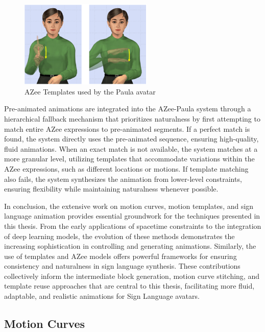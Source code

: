 \documentclass[../../main.tex]{subfiles}
\begin{document}
\begin{figure}
    \centering \includegraphics[width = 2.5in]{chapters/intermediate_blocks/images/azee_template_example.png}
    \caption{AZee Templates used by the Paula avatar}
    \label{fig:azee_template_example}
\end{figure}

Pre-animated animations are integrated into the AZee-Paula system through a hierarchical fallback mechanism that prioritizes naturalness by first attempting to match entire AZee expressions to pre-animated segments. If a perfect match is found, the system directly uses the pre-animated sequence, ensuring high-quality, fluid animations. When an exact match is not available, the system matches at a more granular level, utilizing templates that accommodate variations within the AZee expressions, such as different locations or motions. If template matching also fails, the system synthesizes the animation from lower-level constraints, ensuring flexibility while maintaining naturalness whenever possible.

In conclusion, the extensive work on motion curves, motion templates, and sign language animation provides essential groundwork for the techniques presented in this thesis. From the early applications of spacetime constraints to the integration of deep learning models, the evolution of these methods demonstrates the increasing sophistication in controlling and generating animations. Similarly, the use of templates and AZee models offers powerful frameworks for ensuring consistency and naturalness in sign language synthesis. These contributions collectively inform the intermediate block generation, motion curve stitching, and template reuse approaches that are central to this thesis, facilitating more fluid, adaptable, and realistic animations for Sign Language avatars.

\subsection{Motion Curves}
\label{ch:intermediate_blocks:related_work:motion_curves}
\end{document}
